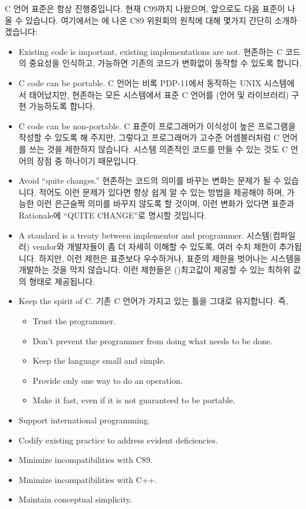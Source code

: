C 언어 표준은 항상 진행중입니다. 현재 C99까지 나왔으며, 앞으로도 다음 표준이
나올 수 있습니다. 여기에서는 \cite{rational2}에 나온 C89 위원회의 원칙에 대해
몇가지 간단히 소개하겠습니다:
\begin{itemize}
  \item Existing code is important, existing implementations are not.
    현존하는 C 코드의 중요성을 인식하고, 가능하면 기존의 코드가 변화없이
    동작할 수 있도록 합니다.
  \item C code can be portable.
    C 언어는 비록 PDP-11에서 동작하는 UNIX 시스템에서 태어났지만, 현존하는
    모든 시스템에서 표준 C 언어를 (언어 및 라이브러리) 구현 가능하도록 합니다.
  \item C code can be non-portable.
    C 표준이 프로그래머가 이식성이 높은 프로그램을 작성할 수 있도록 해 주지만,
    그렇다고 프로그래머가 고수준 어셈블러처럼 C 언어를 쓰는 것을 제한하지
    않습니다. 시스템 의존적인 코드를 만들 수 있는 것도 C 언어의 장점 중 
    하나이기 때문입니다.
  \item Avoid ``quite changes.''
    현존하는 코드의 의미를 바꾸는 변화는 문제가 될 수 있습니다. 적어도 이런
    문제가 있다면 항상 쉽게 알 수 있는 방법을 제공해야 하며, 가능한 이런
    은근슬쩍 의미를 바꾸지 않도록 할 것이며, 이런 변화가 있다면
    표준과 Rationale에 ``QUITE CHANGE''로 명시할 것입니다.
  \item A standard is a treaty between implementor and programmer.
    시스템(컴파일러) vendor와 개발자들이 좀 더 자세히 이해할 수 있도록,
    여러 수치 제한이 추가됩니다. 하지만, 이런 제한은 표준보다 우수하거나,
    표준의 제한을 벗어나는 시스템을 개발하는 것을 막지 않습니다. 이런 제한들은
    ()최고값이 제공할 수 있는 최하위 값의 형태로 제공됩니다.
  \item Keep the spirit of C.
    기존 C 언어가 가지고 있는 틀을 그대로 유지합니다. 즉,
    \begin{itemize}
      \item Trust the programmer.
      \item Don't prevent the programmer from doing what needs to be done.
      \item Keep the language small and simple.
      \item Provide only one way to do an operation.
      \item Make it fast, even if it is not guaranteed to be portable.
    \end{itemize}
  \item Support international programming.
  \item Codify existing practice to address evident deficiencies.
  \item Minimize incompatibilities with C89.
  \item Minimize incompatibilities with C++.
  \item Maintain conceptual simplicity.
\end{itemize}

